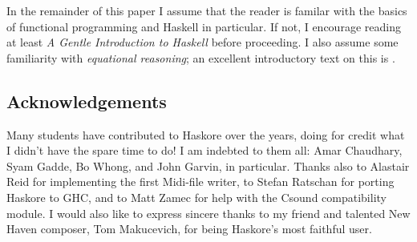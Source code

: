 In the remainder of this paper I assume that the reader is familar
with the basics of functional programming and Haskell in particular.
If not, I encourage reading at least {\em A Gentle Introduction to
Haskell} \cite{haskell-tutorial} before proceeding.  I also assume
some familiarity with {\em equational reasoning}; an excellent
introductory text on this is \cite{birdwadler88}.


\subsection{Acknowledgements}

Many students have contributed to Haskore over the years, doing for
credit what I didn't have the spare time to do!  I am indebted to them
all: Amar Chaudhary, Syam Gadde, Bo Whong, and John Garvin, in
particular.  Thanks also to Alastair Reid for implementing the first
Midi-file writer, to Stefan Ratschan for porting Haskore to GHC, and
to Matt Zamec for help with the Csound compatibility module.  I would
also like to express sincere thanks to my friend and talented New
Haven composer, Tom Makucevich, for being Haskore's most faithful
user.
